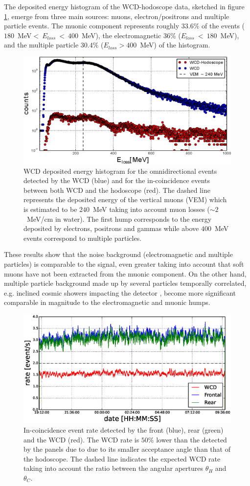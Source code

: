 \documentclass[letterpaper,11pt]{article}
\begin{document}
The deposited energy histogram of the WCD-hodoscope data, sketched in figure \ref{fig:WCDHod_rate}, emerge from three main sources: muons, electron/positrons and multiple particle events. The muonic component represents roughly $33.6\%$ of the events ($180$~MeV$<~E_{loss}~<~400$~MeV), the electromagnetic $36$\% ($E_{loss}~<~180$~MeV), and the multiple particle $30.4\%$ ($E_{loss} > 400$~MeV) of the histogram. 

\begin{figure}
\centering
\includegraphics[width=0.7\columnwidth]{Figures/WCDHod.eps}
\caption{WCD deposited energy histogram for the omnidirectional events detected by the WCD (blue) and for the in-coincidence events between both WCD and the hodoscope (red). The dashed line represents the deposited energy of the vertical muons (VEM) which is estimated to be $240$~MeV taking into account muon losses ($\sim 2$~MeV/cm in water). The first hump corresponds to the energy deposited by electrons, positrons and gammas while above $400$~MeV events correspond to multiple particles.}
\label{fig:WCDHod_rate}
\end{figure}

These results show that the noise background (electromagnetic and multiple particles) is comparable to the signal, even greater taking into account that soft muons have not been extracted from the muonic component. On the other hand, multiple particle background made up by several particles temporally correlated, e.g. inclined cosmic showers impacting the detector \cite{Bonechi2019}, become more significant comparable in magnitude to the electromagnetic and muonic humps.

\begin{figure}[htb]
\centering
\includegraphics[width=0.8\columnwidth]{Figures/HodWCDRate.eps}
\caption{In-coincidence event rate detected by the front (blue), rear (green) and the WCD (red). The WCD rate is $50\%$ lower than the detected by the panels due to due to its smaller acceptance angle than that of the hodoscope. The dashed line indicates the expected WCD rate taking into account the ratio between the angular apertures $\theta_H$ and $\theta_C$.}
\label{fig:RateWCDH}
\end{figure}
\end{document}
